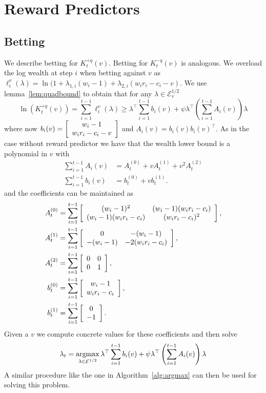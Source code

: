 \section{Reward Predictors}
\label{app:reward-predictors}
\subsection{Betting}
We describe betting for $K_t^{+q}(v)$. Betting for $K_t^{-q}(v)$ 
is analogous. 
We overload the log wealth at step $i$ when betting against $v$ as 
$\ell_i^v(\lambda) = \ln(1+ \lambda_{1,i}(w_i-1) + \lambda_{2,i}(w_i r_i -c_i -v)$. We use lemma~\ref{lem:quadbound} to obtain that for any $\lambda \in \mathcal{E}_v^{1/2}$
\[
\ln(K_t^{+q}(v)) = \sum_{i=1}^{t-1} \ell_i^v(\lambda) \geq \lambda^\top \sum_{i=1}^{t-1} b_i(v) + \psi \lambda^\top \left(\sum_{i=1}^{t-1} A_i(v) \right)\lambda
\]
where now $b_i(v)=\left[\begin{array}{c} w_i-1 \\ w_ir_i -c_i -v \end{array}\right]$ and 
$A_i(v) = b_i(v)b_i(v)^\top$. As in the case without 
reward predictor we have that the wealth lower bound 
is a polynomial in $v$ with
    \begin{align*}
        \sum_{i=1}^{t-1} A_i(v) &= 
        A_t^{(0)} + v A_t^{(1)} + v^2 A_t^{(2)}\\   
        \sum_{i=1}^{t-1} b_i(v) &= b_t^{(0)} + v b_t^{(1)}.  
    \end{align*}
and the coefficients can be maintained as
\allowdisplaybreaks
    \begin{align*}
        A_t^{(0)} &=\sum_{i=1}^{t-1}\left[\begin{array}{cc} (w_i-1)^2 & (w_i-1)(w_i r_i-c_i) \\ (w_i-1)(w_i r_i-c_i) & (w_ir_i-c_i)^2 \end{array}\right], \\
        A_t^{(1)} &= \sum_{i=1}^{t-1} \left[\begin{array}{cc} 0 & -(w_i-1) \\ -(w_i-1) & -2(w_ir_i-c_i) \end{array}\right],\\
        A_t^{(2)} &=\sum_{i=1}^{t-1}  \left[\begin{array}{cc} 0 & 0 \\ 0 & 1 \end{array}\right],\\
        b_t^{(0)} &=\sum_{i=1}^{t-1}  \left[\begin{array}{c} w_i-1 \\ w_ir_i-c_i \end{array}\right],\\
        b_t^{(1)} &=\sum_{i=1}^{t-1}  \left[\begin{array}{c} 0 \\ -1 \end{array}\right].
    \end{align*}
Given a $v$ we compute concrete values for these coefficients 
and then solve 
\[
\lambda_t = \operatorname*{argmax}_{\lambda \in \mathcal{E}^{1/2}} 
\lambda^\top \sum_{i=1}^{t-1} b_i(v) + \psi \lambda^\top \left(\sum_{i=1}^{t-1} A_i(v) \right)\lambda
\]
A similar procedure like the one in Algorithm~\ref{alg:argmax} 
can then be used for solving this problem.

